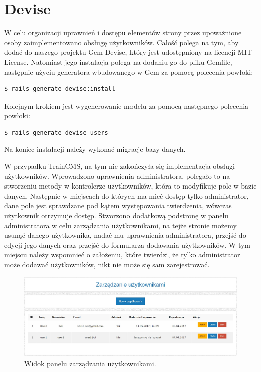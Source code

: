 \documentclass[openright]{xmgr}
\begin{document}
\newpage

\section{Devise}
W celu organizacji uprawnień i dostępu elementów strony przez upoważnione osoby zaimplementowano obsługę użytkowników. Całość polega na tym, aby dodać do naszego projektu Gem Devise\cite{devise}, który jest udostępniony na licencji MIT License. Natomiast jego instalacja polega na dodaniu go do pliku Gemfile, następnie użyciu generatora wbudowanego w Gem za pomocą polecenia powłoki:
\begin{lstlisting}[language=bashes, caption={Polecenie instalujące Gem Devise w naszym projekcie}]
$ rails generate devise:install
\end{lstlisting}
Kolejnym krokiem jest wygenerowanie modelu za pomocą następnego polecenia powłoki:
\begin{lstlisting}[language=bashes, caption={Polecenie generujące model użytkowników w naszym projekcie}]
$ rails generate devise users
\end{lstlisting}
Na koniec instalacji należy wykonać migracje bazy danych.

W przypadku TrainCMS, na tym nie zakończyła się implementacja obsługi użytkowników. Wprowadzono uprawnienia administratora, polegało to na stworzeniu metody w kontrolerze użytkowników, która to modyfikuje pole w bazie danych. Następnie w miejscach do których ma mieć dostęp tylko administrator, dane pole jest sprawdzane pod kątem występowania twierdzenia, wówczas użytkownik otrzymuje dostęp. Stworzono dodatkową podstronę w panelu administratora w celu zarządzania użytkownikami, na tejże stronie możemy usunąć danego użytkownika, nadać mu uprawnienia administratora, przejść do edycji jego danych oraz przejść do formularza dodawania użytkowników. W tym miejscu należy wspomnieć o założeniu, które twierdzi, że tylko administrator może dodawać użytkowników, nikt nie może się sam zarejestrować.

\begin{figure}[!tbh]
\centering
\includegraphics[width=\linewidth]{fig/uzytkownicy}
\caption{Widok panelu zarządzania użytkownikami.}
\end{figure}
\end{document}
